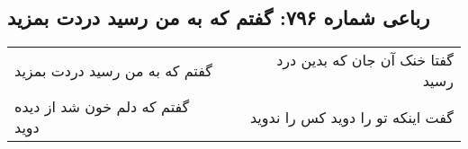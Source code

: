 \begin{center}
\section*{رباعی شماره ۷۹۶: گفتم که به من رسید دردت بمزید}
\label{sec:0796}
\begin{longtable}{l p{0.5cm} r}
گفتم که به من رسید دردت بمزید
&&
گفتا خنک آن جان که بدین درد رسید
\\
گفتم که دلم خون شد از دیده دوید
&&
گفت اینکه تو را دوید کس را ندوید
\\
\end{longtable}
\end{center}
